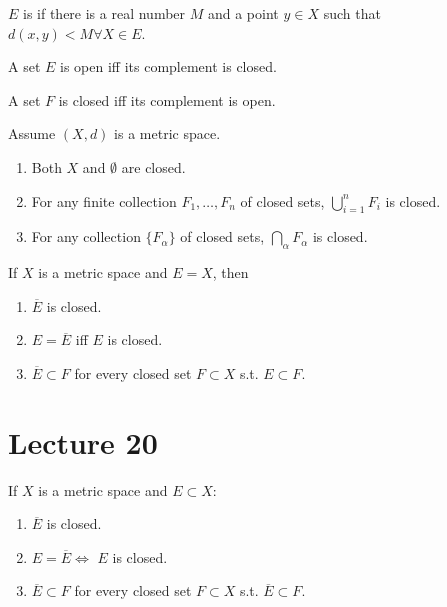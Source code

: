 \documentclass{book}
\begin{document}
\begin{defn}
    $E$ is  if there is a real number $M$ and a point $y \in X$ such that $d(x, y) < M \forall X \in E$. 
\end{defn}

\begin{thm}
    A set $E$ is open iff its complement is closed.
\end{thm}

\begin{corollary}
    A set $F$ is closed iff its complement is open.
\end{corollary}

\begin{thm} 
    Assume $(X, d)$ is a metric space. 
    \begin{enumerate}
        \item Both $X$ and $\emptyset$ are closed.
        \item For any finite collection $F_1, \ldots, F_n$ of closed sets, $\bigcup_{i = 1}^n F_i$ is closed.
        \item For any collection $\{F_\alpha\}$ of closed sets, $\bigcap_{\alpha} F_\alpha$ is closed.
    \end{enumerate}
\end{thm}

\begin{thm}
    If $X$ is a metric space and $E = X$, then
    \begin{enumerate}
        \item $\overline E$ is closed.
        \item $E = \overline E$ iff $E$ is closed.
        \item $\overline E \subset F$ for every closed set $F \subset X$ s.t. $E \subset F$.
    \end{enumerate}
\end{thm}

\section{Lecture 20}
\begin{thm}
    If $X$ is a metric space and $E \subset X$:
    \begin{enumerate}
        \item $\overline E$ is closed.
        \item $E = \overline E \iff$ $E$ is closed.
        \item $\overline E \subset F$ for every closed set $F \subset X$ s.t. $\overline E \subset F$.
    \end{enumerate}
\end{thm}
\end{document}
